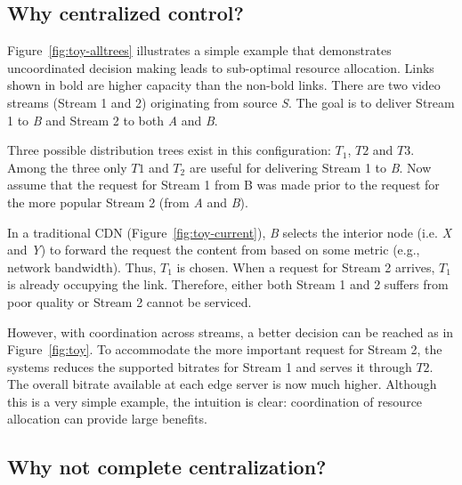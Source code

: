 
\subsection{Why centralized control?}

Figure~\ref{fig:toy-alltrees} illustrates a simple example that 
demonstrates uncoordinated decision making leads to sub-optimal resource allocation. 
Links shown in bold are higher capacity than the non-bold links. 
There are two video streams (Stream 1 and 2) originating from source  \emph{S}.
The goal is to deliver Stream 1 to \emph{B} and Stream 2 to both \emph{A} and \emph{B}.

Three possible distribution trees exist in this configuration: $T_1$,
$T2$ and $T3$. 
Among the three only $T1$ and $T_2$ are useful for delivering Stream 1 to \emph{B}.
Now assume that the request for Stream 1 from B was made prior to the request
for the more popular Stream 2 (from \emph{A} and \emph{B}).

In a traditional CDN (Figure~\ref{fig:toy-current}), \emph{B} selects the interior node
(i.e. \emph{X} and \emph{Y}) to forward the request the content from based on some metric (e.g., network bandwidth). 
Thus, $T_1$ is chosen. When a request for Stream 2 arrives, $T_1$ is already occupying the link.
Therefore, either both Stream 1 and 2 suffers from poor quality or Stream 2 cannot be serviced. 

However, with coordination across streams, a better decision can
be reached as in Figure~\ref{fig:toy}.  To accommodate the more important request for Stream 2, 
the systems reduces the supported bitrates for Stream 1 and
serves it through $T2$.
The overall bitrate available at each edge server is now much higher. 
Although this is a very simple example, the intuition is clear:
coordination of resource allocation can provide large benefits.


\subsection{Why not complete centralization?}



